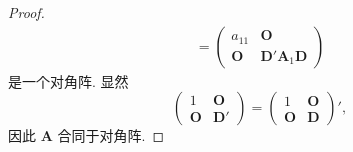 \documentclass[../../main.tex]{subfiles}
\begin{document}
\begin{proof}
\begin{align*}
=
\begin{pmatrix}
a_{11} & \boldsymbol{O} \\
\boldsymbol{O} & \boldsymbol{D}'\boldsymbol{A}_1\boldsymbol{D}
\end{pmatrix}
\end{align*}
是一个对角阵. 显然
\[
\begin{pmatrix}
1 & \boldsymbol{O} \\
\boldsymbol{O} & \boldsymbol{D}'
\end{pmatrix}
=
\begin{pmatrix}
1 & \boldsymbol{O} \\
\boldsymbol{O} & \boldsymbol{D}
\end{pmatrix}',
\]
因此 $\boldsymbol{A}$ 合同于对角阵.

\end{proof}
\end{document}
